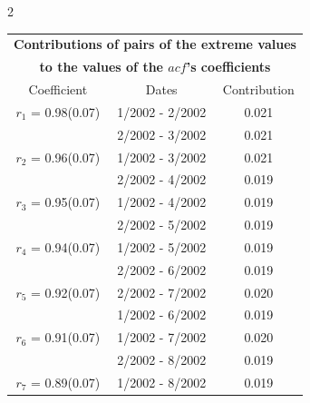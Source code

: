 
\thispagestyle{empty}
\begin{multicols}{2}{ 
\begin{tabular}{ccc}
\multicolumn{3}{c}{\textbf{Contributions of pairs of the extreme values} }  \vspace{-.10in}  \\ 
\multicolumn{3}{c}{ \textbf{to the values of the $acf$'s coefficients}} \\ 
\hline 
\hline                  Coefficient  &  Dates &  Contribution \\ 
\hline 
  $r_{ 1}$ = 0.98(0.07) &       1/2002 -  2/2002 &        0.021   \vspace{-.10in} \\  
&        2/2002 -  3/2002 &        0.021  \vspace{-.02in} \\ \hline 
  $r_{ 2}$ = 0.96(0.07) &       1/2002 -  3/2002 &        0.021   \vspace{-.10in} \\  
&        2/2002 -  4/2002 &        0.019  \vspace{-.02in} \\ \hline 
  $r_{ 3}$ = 0.95(0.07) &       1/2002 -  4/2002 &        0.019   \vspace{-.10in} \\  
&        2/2002 -  5/2002 &        0.019  \vspace{-.02in} \\ \hline 
  $r_{ 4}$ = 0.94(0.07) &       1/2002 -  5/2002 &        0.019   \vspace{-.10in} \\  
&        2/2002 -  6/2002 &        0.019  \vspace{-.02in} \\ \hline 
  $r_{ 5}$ = 0.92(0.07) &       2/2002 -  7/2002 &        0.020   \vspace{-.10in} \\  
&        1/2002 -  6/2002 &        0.019  \vspace{-.02in} \\ \hline 
  $r_{ 6}$ = 0.91(0.07) &       1/2002 -  7/2002 &        0.020   \vspace{-.10in} \\  
&        2/2002 -  8/2002 &        0.019  \vspace{-.02in} \\ \hline 
  $r_{ 7}$ = 0.89(0.07) &       1/2002 -  8/2002 &        0.019   \vspace{-.10in} \\  

\end{tabular}}
\end{multicols}
